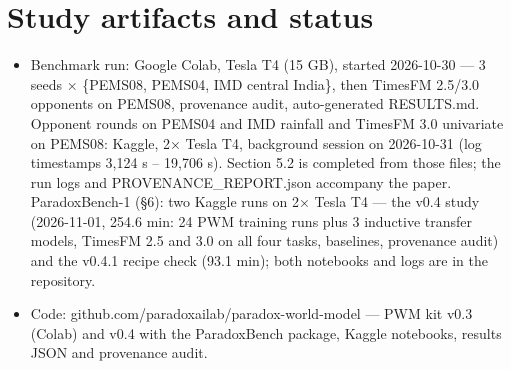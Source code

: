 \documentclass[
  10pt,
]{article}
\providecommand{\tightlist}{%
  \setlength{\itemsep}{0pt}\setlength{\parskip}{0pt}}
\begin{document}
\appendix

\section{Study artifacts and status}

\begin{itemize}
\tightlist
\item
  Benchmark run: Google Colab, Tesla T4 (15 GB), started 2026-10-30 ---
  3 seeds × \{PEMS08, PEMS04, IMD central India\}, then TimesFM 2.5/3.0
  opponents on PEMS08, provenance audit, auto-generated RESULTS.md.
  Opponent rounds on PEMS04 and IMD rainfall and TimesFM 3.0 univariate
  on PEMS08: Kaggle, 2× Tesla T4, background session on 2026-10-31 (log
  timestamps 3,124 s -- 19,706 s). Section 5.2 is completed from those
  files; the run logs and PROVENANCE\_REPORT.json accompany the paper.
  ParadoxBench-1 (§6): two Kaggle runs on 2× Tesla T4 --- the v0.4 study
  (2026-11-01, 254.6 min: 24 PWM training runs plus 3 inductive transfer
  models, TimesFM 2.5 and 3.0 on all four tasks, baselines, provenance
  audit) and the v0.4.1 recipe check (93.1 min); both notebooks and logs
  are in the repository.
\item
  Code: github.com/paradoxailab/paradox-world-model --- PWM kit v0.3
  (Colab) and v0.4 with the ParadoxBench package, Kaggle notebooks,
  results JSON and provenance audit.
\end{itemize}
\end{document}
